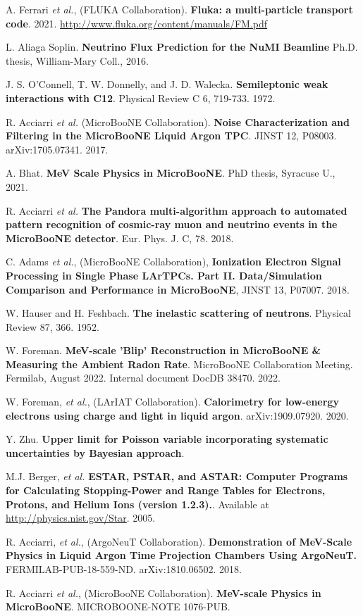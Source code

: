  A. Ferrari \textit{et al.}, (FLUKA Collaboration). \textbf{Fluka:
a multi-particle transport code}. 2021. \href{http://www.fluka.org/content/manuals/FM.pdf
}{http://www.fluka.org/content/manuals/FM.pdf}

 L. Aliaga Soplin. \textbf{Neutrino Flux Prediction for the NuMI Beamline} Ph.D. thesis, William-Mary Coll., 2016.

 J. S. O’Connell, T. W. Donnelly, and J. D. Walecka. \textbf{Semileptonic weak interactions with C12}. Physical Review C 6, 719-733. 1972.

 R. Acciarri \textit{et al.} (MicroBooNE Collaboration). \textbf{Noise Characterization and Filtering in the MicroBooNE Liquid Argon TPC}. JINST 12, P08003. arXiv:1705.07341. 2017. 

 A. Bhat. \textbf{MeV Scale Physics in MicroBooNE}. PhD thesis, Syracuse U., 2021.

 R. Acciarri \textit{et al.} \textbf{The Pandora multi-algorithm approach to automated pattern recognition of cosmic-ray muon and neutrino events in the MicroBooNE detector}. Eur. Phys. J. C, 78. 2018.

 C. Adams \textit{et al.}, (MicroBooNE Collaboration), \textbf{Ionization Electron Signal Processing in Single Phase LArTPCs. Part II. Data/Simulation Comparison and Performance in MicroBooNE}, JINST 13, P07007. 2018.

 W. Hauser and H. Feshbach. \textbf{The inelastic scattering of neutrons}. Physical Review 87, 366. 1952.
 
 W. Foreman. \textbf{MeV-scale 'Blip' Reconstruction in MicroBooNE \&
Measuring the Ambient Radon Rate}. MicroBooNE Collaboration Meeting. Fermilab, August 2022. Internal document DocDB 38470. 2022. 

 W. Foreman, \textit{et al.}, (LArIAT Collaboration). \textbf{Calorimetry for low-energy electrons using charge and light in liquid argon}. arXiv:1909.07920. 2020.

 Y. Zhu. \textbf{Upper limit for Poisson variable incorporating systematic uncertainties by Bayesian approach}.

  M.J. Berger, \textit{et al.} \textbf{ESTAR, PSTAR, and ASTAR: Computer Programs for Calculating Stopping-Power and Range Tables for Electrons, Protons, and Helium Ions (version 1.2.3).}. Available at \href{http://physics.nist.gov/Star}{http://physics.nist.gov/Star}. 2005.

 R. Acciarri, \textit{et al.}, (ArgoNeuT Collaboration). \textbf{Demonstration of MeV-Scale Physics in
Liquid Argon Time Projection Chambers Using ArgoNeuT.} FERMILAB-PUB-18-559-ND. arXiv:1810.06502. 2018.

 R. Acciarri \textit{et al.}, (MicroBooNE Collaboration). \textbf{MeV-scale Physics in MicroBooNE}. MICROBOONE-NOTE 1076-PUB. 